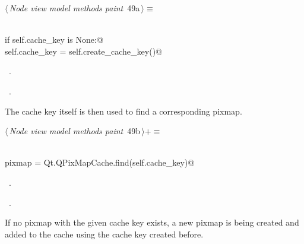 \documentclass[
    a4paper,      %
    10pt,         %
    openright,    %
    notitlepage,  %
    parskip=half, %
]{scrreprt}       %
\theoremstyle{definition}                    %
\begin{document}
\begin{flushleft} \small
\begin{minipage}{\linewidth}\label{scrap69}\raggedright\small
{} $\langle\,${\itshape Node view model methods paint}\nobreak\ {\footnotesize {49a}}$\,\rangle\equiv$
\vspace{-1ex}
\begin{list}{}{} \item
\mbox{}\lstinline@@\\
\mbox{}\lstinline@    if self.cache_key is None:@\\
\mbox{}\lstinline@        self.cache_key = self.create_cache_key()@\\
\mbox{}\lstinline@@{\NWsep}
\end{list}
\vspace{-1.5ex}
\footnotesize
\begin{list}{}{\setlength{\itemsep}{-\parsep}\setlength{\itemindent}{-\leftmargin}}
\item \NWtxtMacroDefBy\ .
\item \NWtxtMacroRefIn\ .

\item{}
\end{list}
\end{minipage}\vspace{4ex}
\end{flushleft}
The cache key itself is then used to find a corresponding pixmap.

\begin{flushleft} \small
\begin{minipage}{\linewidth}\label{scrap70}\raggedright\small
{} $\langle\,${\itshape Node view model methods paint}\nobreak\ {\footnotesize {49b}}$\,\rangle+\equiv$
\vspace{-1ex}
\begin{list}{}{} \item
\mbox{}\lstinline@@\\
\mbox{}\lstinline@    pixmap = Qt.QPixMapCache.find(self.cache_key)@\\
\mbox{}\lstinline@@{\NWsep}
\end{list}
\vspace{-1.5ex}
\footnotesize
\begin{list}{}{\setlength{\itemsep}{-\parsep}\setlength{\itemindent}{-\leftmargin}}
\item \NWtxtMacroDefBy\ .
\item \NWtxtMacroRefIn\ .

\item{}
\end{list}
\end{minipage}\vspace{4ex}
\end{flushleft}
If no pixmap with the given cache key exists, a new pixmap is being created and
added to the cache using the cache key created before.
\end{document}
